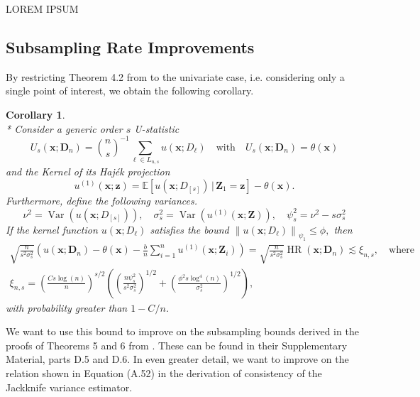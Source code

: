\documentclass[letterpaper,10pt]{article}
\numberwithin{equation}{section}
\numberwithin{thm}{section}
\numberwithin{lem}{section}
\newtheorem{cor}{Corollary}
\numberwithin{cor}{section}
\newcommand{\1}{\mathbb{1}}
\begin{document}
{\color{red} LOREM IPSUM}

\subsection{Subsampling Rate Improvements}

By restricting Theorem 4.2 from \citet{ritzwoller_uniform_2024} to the univariate case, i.e. considering only a single point of interest, we obtain the following corollary.
\begin{cor}\mbox{}\\*
	Consider a generic order $s$ U-statistic
	\begin{equation}
		U_{s}(\mathbf{x}; \mathbf{D}_n)
		= \binom{n}{s}^{-1} \sum_{\ell \in L_{n,s}}u(\mathbf{x}; D_{\ell})
		\quad \text{with} \quad
		U_{s}(\mathbf{x}; \mathbf{D}_n) = \theta(\mathbf{x})
	\end{equation}
	and the Kernel of its Haj\'ek projection
	\begin{equation}
		u^{(1)}\left(\mathbf{x}; \mathbf{z}\right)
		= \mathbb{E}\left[u(\mathbf{x}; D_{[s]}) \, | \, \mathbf{Z}_1 = \mathbf{z}\right] - \theta(\mathbf{x}).
	\end{equation}
	Furthermore, define the following variances.
	\begin{equation}
		\nu^2 = \operatorname{Var}\left(u(\mathbf{x}; D_{[s]})\right), \quad
		\sigma_{s}^2 = \operatorname{Var}\left(u^{(1)}(\mathbf{x}; \mathbf{Z})\right), \quad
		\psi_{s}^2 = \nu^2 - s \sigma_{s}^2
	\end{equation}
	If the kernel function $u\left(\mathbf{x} ; D_{\ell}\right)$ satisfies the bound
	$\left\|u(\mathbf{x}; D_{\ell})\right\|_{\psi_1} \leq \phi,$
	then
	\begin{align}
		\sqrt{\frac{n}{{s}^2 \sigma_{s}^2}}
		\left(u(\mathbf{x}; \mathbf{D}_n) - \theta(\mathbf{x}) - \frac{b}{n} \sum_{i=1}^n u^{(1)}(\mathbf{x}; \mathbf{Z}_{i})\right)
		= \sqrt{\frac{n}{{s}^2 \sigma_{s}^2}} \operatorname{HR}(\mathbf{x}; \mathbf{D}_n)
		\lesssim \xi_{n, s},
		\quad \text {where} \\
		\xi_{n, s}
		= \left(\frac{C s \log(n)}{n}\right)^{s / 2}\left(\left(\frac{n \psi_{s}^2}{{s}^2 \sigma_{s}^2}\right)^{1 / 2}+\left(\frac{\phi^2 s \log ^4(n)}{\sigma_{s}^2}\right)^{1 / 2}\right),
	\end{align}
	with probability greater than $1-C / n$.
\end{cor}

We want to use this bound to improve on the subsampling bounds derived in the proofs of Theorems 5 and 6 from \cite{demirkaya_optimal_2024}.
These can be found in their Supplementary Material, parts D.5 and D.6.
	{\color{red} In even greater detail, we want to improve on the relation shown in Equation (A.52) in the derivation of consistency of the Jackknife variance estimator.}
\end{document}
